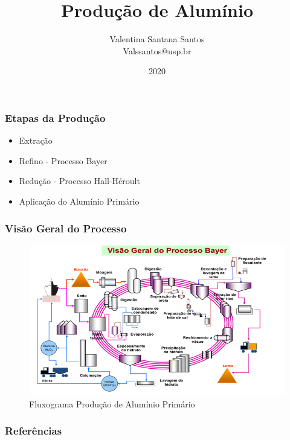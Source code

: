 \documentclass{beamer}
\title[Alumínio]{Produção de Alumínio}
\author[Valentina Santana]{Valentina Santana Santos \\
  Valssantos@usp.br}
\date[2020]{2020}
\begin{document}
\begin{frame}
  \maketitle
\end{frame}


\begin{frame}
  \frametitle{Etapas da Produção}

  \begin{itemize}
  \item[\color{red}]Extração
  \item[\color{red}]Refino - Processo Bayer \cite{martires2009}
  \item[\color{red}]Redução - Processo Hall-Héroult \cite{massara2004}
  \item[\color{red}]Aplicação do Alumínio Primário
  \end{itemize}

\end{frame}

\begin{frame}
  \frametitle{Visão Geral do Processo}

  \begin{tcolorbox}

  \begin{figure}
    \caption{Fluxograma Produção de Alumínio Primário}
    \includegraphics[width=0.4\linewidth]{aluminio_bayer.png}

  \end{figure}
\end{tcolorbox}

\end{frame}


\begin{frame}
  \frametitle{Referências}
  
\end{frame}
\end{document}
